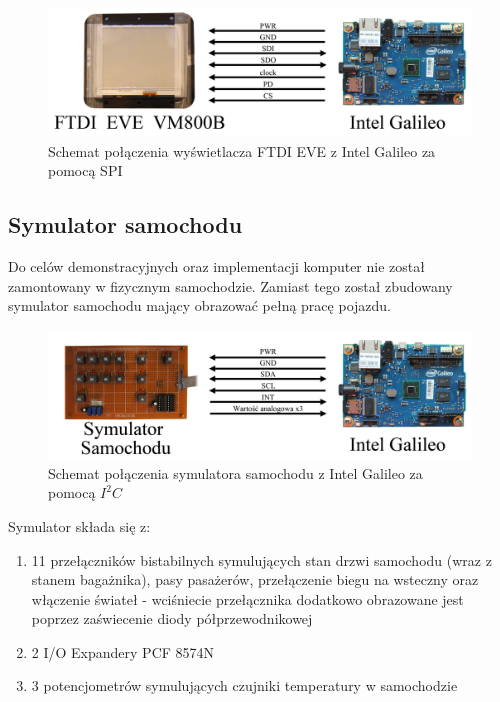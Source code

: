 \documentclass{xmgr}
\begin{document}
\begin{figure}[!h]
    \centering
    \includegraphics[height=0.24\textheight]{images/ekranGalileo.jpg}
    \caption{Schemat połączenia wyświetlacza FTDI EVE z Intel Galileo za pomocą SPI}
\end{figure}

\subsection{Symulator samochodu}
Do celów demonstracyjnych oraz implementacji komputer nie został zamontowany w fizycznym samochodzie. Zamiast tego został zbudowany symulator samochodu mający obrazować pełną pracę pojazdu.

\begin{figure}[!h]
    \centering
    \includegraphics[height=0.24\textheight]{images/symulatorGalileo.jpg}
    \caption{Schemat połączenia symulatora samochodu z Intel Galileo za pomocą $I^2C$}
\end{figure}

Symulator składa się z:
\begin{enumerate}
	\item 11 przełączników bistabilnych symulujących stan drzwi samochodu (wraz z stanem bagażnika), pasy pasażerów, przełączenie biegu na wsteczny oraz włączenie świateł - wciśniecie przełącznika dodatkowo obrazowane jest poprzez zaświecenie diody półprzewodnikowej
	\item 2 I/O Expandery PCF 8574N 
	\item 3 potencjometrów symulujących czujniki temperatury w samochodzie
\end{enumerate}
\end{document}
